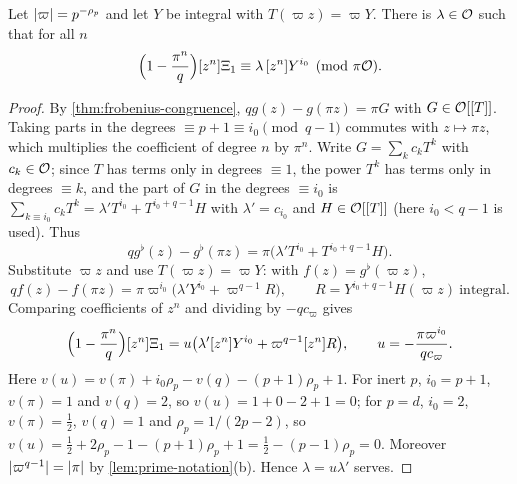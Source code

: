 \begin{lemma}\label{lem:functional-equation}
Let $\lvert \varpi\rvert=p^{-\rho_p}$ and let $Y$ be integral with $T(\varpi z)=\varpi Y$. There is
$\lambda\in\mathcal{O}$ such that for all $n$
\[
  \Bigl(1-\frac{\pi^n}q\Bigr)[z^n]\Xi_1\equiv\lambda\,[z^n]Y^{i_0}\pmod{\pi\mathcal{O}}.
\]
\end{lemma}

\begin{proof}
By \cref{thm:frobenius-congruence}, $qg(z)-g(\pi z)=\pi G$ with $G\in\mathcal{O}[[T]]$. Taking parts in the
degrees $\equiv p+1\equiv i_0\pmod{q-1}$ commutes with $z\mapsto\pi z$, which multiplies the
coefficient of degree $n$ by $\pi^n$. Write $G=\sum_kc_kT^k$ with $c_k\in\mathcal{O}$; since $T$ has terms
only in degrees $\equiv1$, the power $T^k$ has terms only in degrees $\equiv k$, and the part of $G$ in
the degrees $\equiv i_0$ is $\sum_{k\equiv i_0}c_kT^k=\lambda'T^{i_0}+T^{i_0+q-1}H$ with
$\lambda'=c_{i_0}$ and $H\in\mathcal{O}[[T]]$ (here $i_0<q-1$ is used). Thus
\[
  qg^\flat(z)-g^\flat(\pi z)=\pi\bigl(\lambda'T^{i_0}+T^{i_0+q-1}H\bigr).
\]
Substitute $\varpi z$ and use $T(\varpi z)=\varpi Y$: with $f(z)=g^\flat(\varpi z)$,
\[
  qf(z)-f(\pi z)=\pi\varpi^{i_0}\bigl(\lambda'Y^{i_0}+\varpi^{q-1}R\bigr),\qquad
  R=Y^{i_0+q-1}H(\varpi z)\ \text{integral}.
\]
Comparing coefficients of $z^n$ and dividing by $-qc_\varpi$ gives
\[
  \Bigl(1-\frac{\pi^n}q\Bigr)[z^n]\Xi_1=u\bigl(\lambda'[z^n]Y^{i_0}+\varpi^{q-1}[z^n]R\bigr),\qquad
  u=-\frac{\pi\varpi^{i_0}}{qc_\varpi}.
\]
Here $v(u)=v(\pi)+i_0\rho_p-v(q)-(p+1)\rho_p+1$. For inert $p$, $i_0=p+1$, $v(\pi)=1$ and $v(q)=2$, so $v(u)=1+0-2+1=0$; for $p=d$, $i_0=2$, $v(\pi)=\frac12$, $v(q)=1$ and $\rho_p=1/(2p-2)$, so $v(u)=\frac12+2\rho_p-1-(p+1)\rho_p+1=\frac12-(p-1)\rho_p=0$. Moreover $\lvert \varpi^{q-1}\rvert=\lvert \pi\rvert$ by
\cref{lem:prime-notation}(b). Hence $\lambda=u\lambda'$ serves.
\end{proof}

